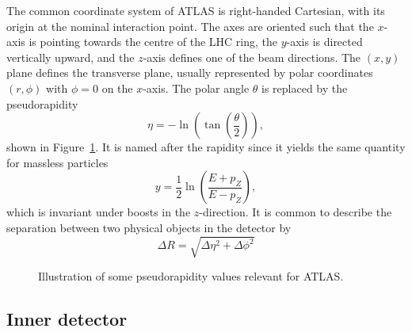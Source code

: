 The common coordinate system of ATLAS is right-handed Cartesian, 
with its origin at the nominal interaction point. 
The axes are oriented such that the $x$-axis is pointing towards the centre of the LHC ring, the $y$-axis is directed
vertically upward, and the $z$-axis defines one of the beam directions.
The $(x, y)$ plane defines the transverse plane, usually represented by polar coordinates $(r,\phi)$
with $\phi=0$ on the $x$-axis.
The polar angle $\theta$ is replaced by the pseudorapidity
\begin{equation}
\eta = - \ln\left(\tan\left(\frac{\theta}{2}\right)\right),
\end{equation}
shown in Figure~\ref{fig:exp.atlas.pseudo}.
It is named after the rapidity since it yields the same quantity for massless particles
\begin{equation}
y = \frac{1}{2}\ln\left(\frac{E+p_Z}{E-p_Z}\right),
\end{equation}
which is invariant under boosts in the $z$-direction.
It is common to describe the separation between two physical objects in the detector by 
\begin{equation}
\Delta R = \sqrt{\Delta \eta^2 + \Delta \phi^2}
\end{equation}

\begin{figure}[htb!]
\centering
{}
\caption{Illustration of some pseudorapidity values relevant for ATLAS.}
\label{fig:exp.atlas.pseudo}
\end{figure} 

\subsection{Inner detector}

